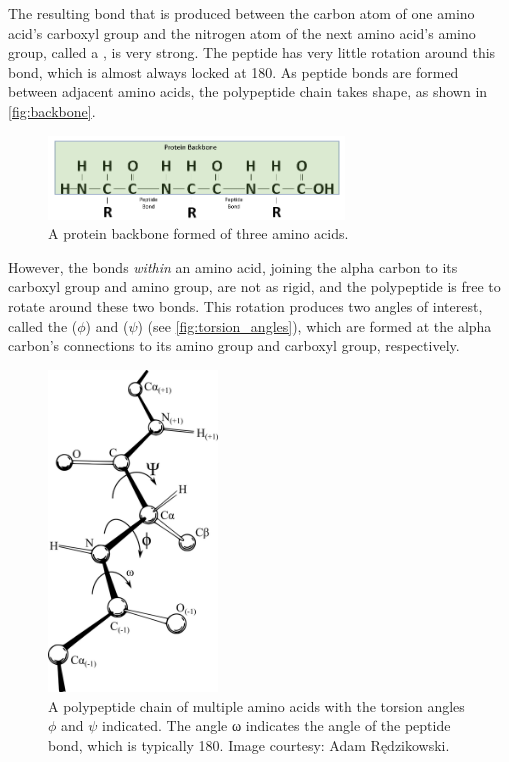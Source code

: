 The resulting bond that is produced between the carbon atom of one amino acid's carboxyl group and the nitrogen atom of the next amino acid's amino group, called a , is very strong. The peptide has very little rotation around this bond, which is almost always locked at 180\textdegree. As peptide bonds are formed between adjacent amino acids, the polypeptide chain takes shape, as shown in \autoref{fig:backbone}.

\begin{figure}[h]
	\centering
	\mySfFamily
	\includegraphics[width = 0.7\textwidth]{../images/Backbone.png}
	\caption{A protein backbone formed of three amino acids.}
	\label{fig:backbone}
\end{figure}

However, the bonds \textit{within} an amino acid, joining the alpha carbon to its carboxyl group and amino group, are not as rigid, and the polypeptide is free to rotate around these two bonds. This rotation produces two angles of interest, called the  ($\phi$) and  ($\psi$) (see \autoref{fig:torsion_angles}), which are formed at the alpha carbon's connections to its amino group and carboxyl group, respectively.

\begin{figure}[h]
	\centering
	\mySfFamily
	\includegraphics[width = 0.4\textwidth]{../images/torsion_angles.png}
	\caption{A polypeptide chain of multiple amino acids with the torsion angles $\phi$ and $\psi$ indicated. The angle ω indicates the angle of the peptide bond, which is typically 180\textdegree. Image courtesy: Adam Rędzikowski.}
	\label{fig:torsion_angles}
\end{figure}

